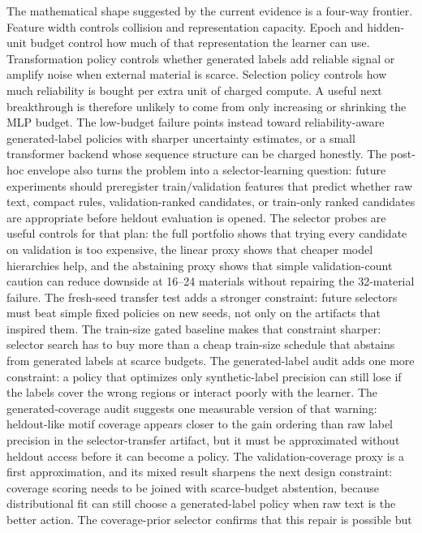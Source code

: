 \documentclass[11pt]{article}
\begin{document}
The mathematical shape suggested by the current evidence is a four-way
frontier. Feature width controls collision and representation capacity. Epoch
and hidden-unit budget control how much of that representation the learner can
use. Transformation policy controls whether generated labels add reliable
signal or amplify noise when external material is scarce. Selection policy
controls how much reliability is bought per extra unit of charged compute. A
useful next breakthrough is therefore unlikely to come from only increasing or
shrinking the MLP budget. The low-budget failure points instead toward
reliability-aware generated-label policies with sharper uncertainty estimates,
or a small transformer backend whose sequence structure can be charged honestly.
The post-hoc envelope also turns the problem into a selector-learning question:
future experiments should preregister train/validation features that predict
whether raw text, compact rules, validation-ranked candidates, or train-only
ranked candidates are appropriate before heldout evaluation is opened.
The selector probes are useful controls for that plan: the full portfolio shows
that trying every candidate on validation is too expensive, the linear proxy
shows that cheaper model hierarchies help, and the abstaining proxy shows that
simple validation-count caution can reduce downside at 16--24 materials without
repairing the 32-material failure. The fresh-seed transfer test adds a stronger
constraint: future selectors must beat simple fixed policies on new seeds, not
only on the artifacts that inspired them. The train-size gated baseline makes
that constraint sharper: selector search has to buy more than a cheap
train-size schedule that abstains from generated labels at scarce budgets.
The generated-label audit adds one more constraint: a policy that optimizes
only synthetic-label precision can still lose if the labels cover the wrong
regions or interact poorly with the learner.
The generated-coverage audit suggests one measurable version of that warning:
heldout-like motif coverage appears closer to the gain ordering than raw label
precision in the selector-transfer artifact, but it must be approximated
without heldout access before it can become a policy.
The validation-coverage proxy is a first approximation, and its mixed result
sharpens the next design constraint: coverage scoring needs to be joined with
scarce-budget abstention, because distributional fit can still choose a
generated-label policy when raw text is the better action.
The coverage-prior selector confirms that this repair is possible but
\end{document}
